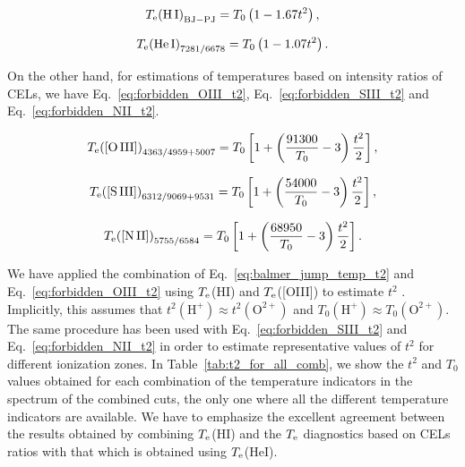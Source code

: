 \documentclass[fleqn,usenatbib]{mnras}
\begin{document}
\begin{equation}
    \label{eq:balmer_jump_temp_t2}
    T_{\rm e}{(\text{H}\thinspace \text{I})}_{\text{BJ}-\text{PJ}}=T_0\left(1-1.67t^2 \right),
\end{equation}{}

\begin{equation}
    \label{eq:helium_temp_t2}
    T_{\rm e}{(\text{He}\thinspace \text{I})}_{7281/6678}=T_0\left(1-1.07t^2 \right).
\end{equation}{}


On the other hand, for estimations of  temperatures based on intensity ratios of CELs, we have Eq.~\eqref{eq:forbidden_OIII_t2}, Eq.~\eqref{eq:forbidden_SIII_t2} and Eq.~\eqref{eq:forbidden_NII_t2}.


\begin{equation}
    \label{eq:forbidden_OIII_t2}
    T_{\rm e}{(\text{[O}\thinspace \text{III]})}_{4363/4959+5007}=T_0 \left[1+\left(\frac{91300}{ T_0}-3\right)\frac{t^2}{2} \right],
\end{equation}{}

\begin{equation}
    \label{eq:forbidden_SIII_t2}
    T_{\rm e}{(\text{[S}\thinspace \text{III]})}_{6312/9069+9531}=T_0 \left[1+\left(\frac{54000}{ T_0}-3\right)\frac{t^2}{2} \right],
\end{equation}{}

\begin{equation}
    \label{eq:forbidden_NII_t2}
    T_{\rm e}{(\text{[N}\thinspace \text{II]})}_{5755/6584}=T_0 \left[1+\left(\frac{68950}{ T_0}-3\right)\frac{t^2}{2} \right].
\end{equation}{}

We have applied the combination of Eq.~\eqref{eq:balmer_jump_temp_t2} and Eq.~\eqref{eq:forbidden_OIII_t2} using  $T_{\rm e}$(\mbox{H}\thinspace \mbox{I}) and $T_{\rm e}$(\mbox{[O}\thinspace \mbox{III]}) to estimate $t^2$  \citep{Peimbert03,Esteban04,garciarojas04,garciarojas05,garciarojas07-2}. Implicitly, this assumes that $t^{2}(\text{H}^{+})\approx t^{2}(\text{O}^{2+})$ and $T_0(\text{H}^{+})\approx T_0(\text{O}^{2+})$. The same procedure has been used with Eq.~\eqref{eq:forbidden_SIII_t2} and Eq.~\eqref{eq:forbidden_NII_t2} \citep{Peimbert69,Esteban98} in order to estimate representative values of $t^{2}$ for different ionization zones. In Table~\eqref{tab:t2_for_all_comb}, we show the  $t^{2}$ and $T_{\text{0}}$ values obtained for each combination of the temperature indicators in the spectrum of the combined cuts, the only one where all the different temperature indicators are available. We have to emphasize the excellent agreement between the results obtained by combining $T_{\rm e}$(\mbox{H}\thinspace \mbox{I}) and the $T_{\rm e}$ diagnostics based on CELs ratios with that which is obtained using $T_{\rm e}$(\mbox{He}\thinspace \mbox{I}).
\end{document}
